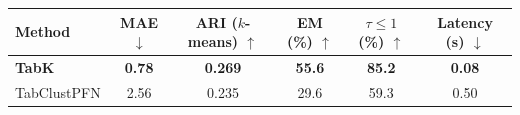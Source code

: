 \begin{tabular}{l c c c c c}
\toprule
Method &  MAE $\downarrow$ & ARI ($k$-means) $\uparrow$ & EM (\%) $\uparrow$ & $\tau\leq1$ (\%) $\uparrow$ & Latency (s) $\downarrow$ \\
\midrule
\textbf{TabK} & \textbf{0.78} & \textbf{0.269} & \textbf{55.6} & \textbf{85.2} & \textbf{0.08} \\
TabClustPFN & 2.56 & 0.235 & 29.6 & 59.3 & 0.50 \\
\bottomrule
\end{tabular}
